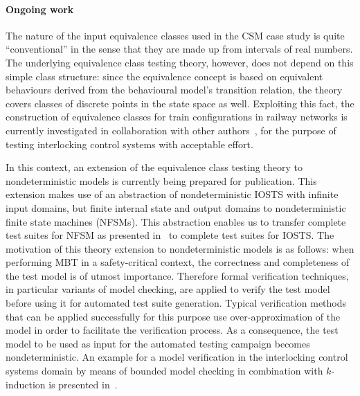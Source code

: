 \paragraph{Ongoing work}
The nature of the input equivalence classes used in the CSM case study is quite ``conventional'' in the sense that they are made up from intervals of real numbers. The underlying equivalence class testing theory, however, does not depend on this simple
class structure: since the equivalence concept is based on equivalent behaviours derived from the behavioural model's transition relation, the theory covers classes
of discrete points in the state space as well. Exploiting this fact, the construction of
equivalence classes for train configurations in railway networks 
is currently  investigated in collaboration with other authors~\cite{ftscs}, 
for the purpose of testing interlocking control systems with acceptable effort. 

In this context, an extension of the equivalence class testing theory to nondeterministic models is currently being prepared for publication. This extension makes use of an
abstraction of nondeterministic IOSTS with infinite input domains, but 
finite internal state and output domains to nondeterministic finite state machines 
(NFSMs). This
abstraction enables us to transfer   complete test suites for NFSM
as presented in~\cite{petrenko_testing_2011,petrenko_testing_2014,hierons_testing_2004}
to complete test suites for IOSTS. The motivation of this theory extension to nondeterministic models is as follows: when performing MBT in a safety-critical context,
the correctness and completeness of the test model is of utmost importance. Therefore
formal verification techniques, in particular variants of model checking, are applied
to verify the test model before using it for automated test suite generation.
Typical verification methods that can be applied successfully for this purpose
use over-approximation of the model in order to facilitate the verification process. 
As a consequence, the test model to be used as input for the automated testing campaign
becomes nondeterministic. An example for a model verification in the interlocking 
control systems domain by means of bounded model checking in combination with $k$-induction is presented
in~\cite{ftscs}. 





